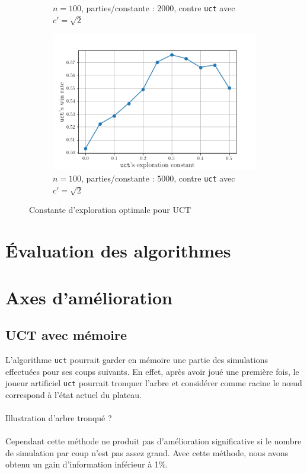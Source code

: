 \documentclass[a4paper]{article}
\theoremstyle{definition}
\begin{document}
\begin{figure}[!h]
\begin{subfigure}{0.32\textwidth}
		\caption{$n=100$, parties/constante : $2000$, contre \texttt{uct} avec $c' = \sqrt{2}$}
		\label{fig:2_}
	\end{subfigure}
	\hfill
	\begin{subfigure}{0.32\textwidth}
		\centering
		\includegraphics[width=\textwidth]{test3.png}
		\caption{$n=100$, parties/constante : $5000$, contre \texttt{uct} avec $c' = \sqrt{2}$}
		\label{fig:3_}
	\end{subfigure}
	\caption{Constante d'exploration optimale pour UCT}
	\label{fig:best-cst}
\end{figure}

\newpage

\section{Évaluation des algorithmes}


\newpage

\section{Axes d'amélioration}

\subsection{UCT avec mémoire}

L'algorithme \texttt{uct} pourrait garder en mémoire une partie des simulations effectuées pour ses coups suivants. En effet, après avoir joué une première fois, le joueur artificiel \texttt{uct} pourrait tronquer l'arbre et considérer comme racine le nœud correspond à l'état actuel du plateau.\\
\\
Illustration d'arbre tronqué ?\\
\\
Cependant cette méthode ne produit pas d'amélioration significative si le nombre de simulation par coup n'est pas assez grand. Avec cette méthode, nous avons obtenu un gain d'information inférieur à 1\%.
\end{document}

